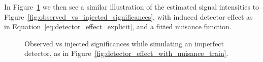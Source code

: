 \documentclass[paper/ddppaper2.tex]{subfiles}
\begin{document}
In Figure~\ref{fig:detector_affected_significances} we then see a similar illustration of the estimated signal intensities to Figure~\ref{fig:observed_vs_injected_significances}, with induced detector effect as in Equation~\ref{eq:detector_effect_explicit}, and a fitted nuisance function.

\begin{figure}
    \caption{Observed vs injected significances while simulating an imperfect detector, as in Figure~\ref{fig:detector_effect_with_nuisance_train}.}
    \label{fig:detector_affected_significances}
\end{figure}
\end{document}
